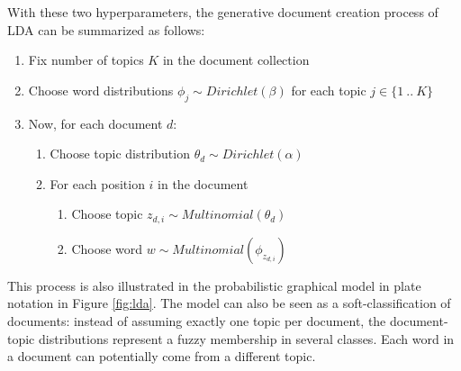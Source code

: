 \documentclass[
        a4paper,
        titlepage,
        twoside,
        parskip
        ]{scrbook}
\theoremstyle{break}
\begin{document}
With these two hyperparameters, the generative document creation process of LDA can be summarized as follows:
\begin{enumerate}
       \item Fix number of topics $K$ in the document collection
       \item Choose word distributions $\phi_j \sim Dirichlet(\beta)$ for each topic $j \in \{1~..~K\}$
       \item Now, for each document $d$:
       \begin{enumerate}
              \item Choose topic distribution $\theta_d \sim Dirichlet(\alpha)$
              \item For each position $i$ in the document
              \begin{enumerate}
                     \item Choose topic $z_{d,i} \sim Multinomial(\theta_d)$
                     \item Choose word $w \sim Multinomial(\phi_{z_{d,i}})$
              \end{enumerate}
       \end{enumerate}
\end{enumerate}
This process is also illustrated in the probabilistic graphical model in plate notation in Figure \ref{fig:lda}.
The model can also be seen as a soft-classification of documents: instead of assuming exactly one topic per document, the document-topic distributions represent a fuzzy membership in several classes.
Each word in a document can potentially come from a different topic.
\end{document}

